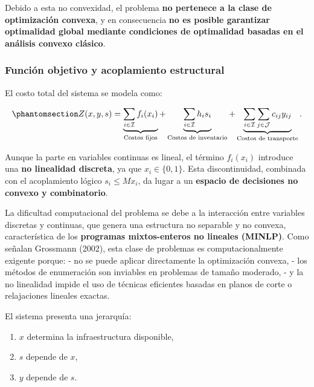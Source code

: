 \documentclass[
  spanish,
  us-letterpaper,
  DIV=11,
  numbers=noendperiod]{scrreprt}
\providecommand{\tightlist}{%
  \setlength{\itemsep}{0pt}\setlength{\parskip}{0pt}}
\numberwithin{equation}{section}
\begin{document}
Debido a esta no convexidad, el problema \textbf{no pertenece a la clase
de optimización convexa}, y en consecuencia \textbf{no es posible
garantizar optimalidad global mediante condiciones de optimalidad
basadas en el análisis convexo clásico}.

\subsubsection{Función objetivo y acoplamiento
estructural}\label{funciuxf3n-objetivo-y-acoplamiento-estructural}

El costo total del sistema se modela como:

\begin{equation}\phantomsection\label{eq-Zux28xysux29}{
Z(x,y,s) 
= 
\underbrace{\sum_{i\in\mathcal{I}} f_i(x_i)}_{\text{Costos fijos}}
+ \underbrace{\sum_{i\in\mathcal{I}} h_i s_i}_{\text{Costos de inventario}}
+ \underbrace{\sum_{i\in\mathcal{I}}\sum_{j\in\mathcal{J}} c_{ij} y_{ij}}_{\text{Costos de transporte}}.
}\end{equation}

Aunque la parte en variables continuas es lineal, el término
\(f_i(x_i)\) introduce una \textbf{no linealidad discreta}, ya que
\(x_i \in \{0,1\}\). Esta discontinuidad, combinada con el acoplamiento
lógico \(s_i \leq M x_i\), da lugar a un \textbf{espacio de decisiones
no convexo y combinatorio}.

La dificultad computacional del problema se debe a la interacción entre
variables discretas y continuas, que genera una estructura no separable
y no convexa, característica de los \textbf{programas mixtos-enteros no
lineales (MINLP)}. Como señalan Grossmann (2002), esta clase de
problemas es computacionalmente exigente porque: - no se puede aplicar
directamente la optimización convexa, - los métodos de enumeración son
inviables en problemas de tamaño moderado, - y la no linealidad impide
el uso de técnicas eficientes basadas en planos de corte o relajaciones
lineales exactas.

El sistema presenta una jerarquía:

\begin{enumerate}
\def\labelenumi{\arabic{enumi}.}
\tightlist
\item
  \(x\) determina la infraestructura disponible,\\
\item
  \(s\) depende de \(x\),\\
\item
  \(y\) depende de \(s\).
\end{enumerate}
\end{document}
